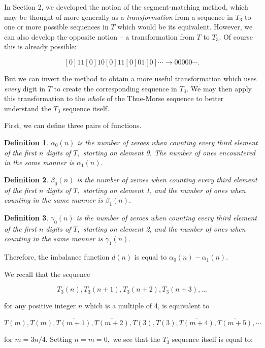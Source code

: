 \documentclass{article}
\newtheorem{definition}{Definition}[section]
\begin{document}
In Section 2, we developed the notion of the segment-matching method, which may be thought of more generally as a \emph{transformation} from a sequence in $T_3$ to one or more possible sequences in $T$ which would be its equivalent. However, we can also develop the opposite notion -- a transformation from $T$ to $T_3.$ Of course this is already possible:

$$[0]11[0]10[0]11[0]01[0] \cdots \rightarrow 00000 \cdots .$$

But we can invert the method to obtain a more useful transformation which uses \emph{every} digit in $T$ to create the corresponding sequence in $T_3.$ We may then apply this transformation to the \emph{whole} of the Thue-Morse sequence to better understand the $T_3$ sequence itself.

First, we can define three pairs of functions.

\begin{definition}
$\alpha_0(n)$ is the number of zeroes when counting every third element of the first $n$ digits of $T,$ starting on element 0. The number of ones encountered in the same manner is $\alpha_1(n).$
\end{definition}

\begin{definition}
$\beta_0(n)$ is the number of zeroes when counting every third element of the first $n$ digits of $T,$ starting on element 1, and the number of ones when counting in the same manner is $\beta_1(n).$
\end{definition}

\begin{definition}
$\gamma_0(n)$ is the number of zeroes when counting every third element of the first $n$ digits of $T,$ starting on element 2, and the number of ones when counting in the same manner is $\gamma_1(n).$
\end{definition}

Therefore, the imbalance function $d(n)$ is equal to $\alpha_0(n) - \alpha_1(n).$

We recall that the sequence

$$T_3(n), T_3(n+1), T_3(n+2), T_3(n+3), ...$$

for any positive integer $n$ which is a multiple of 4, is equivalent to

$$T(m), T(m), \overline{T(m+1)}, \overline{T(m+2)}, T(3), T(3), \overline{T(m+4)}, \overline{T(m+5)}, \cdots$$

for $m = 3n/4.$ Setting $n = m = 0,$ we see that the $T_3$ sequence itself is equal to:
\end{document}
